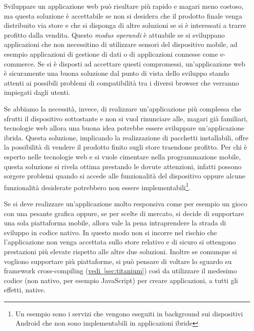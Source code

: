 		Sviluppare un applicazione web può risultare più rapido e magari meno 
		costoso, ma questa soluzione è accettabile se non si desidera che il 
		prodotto finale venga distribuito via store e che si disponga di 
		altre soluzioni se si è interessati a trarre profitto dalla vendita.
		Questo \textit{modus operandi} è attuabile se si sviluppano applicazioni
		che non necessitino di utilizzare sensori del dispositivo mobile, ad
		esempio applicazioni di gestione di dati o di applicazioni connesse 
		come e-commerce. Se si è disposti ad accettare questi compromessi,
		un'applicazione web è sicuramente una buona soluzione dal punto di vista 
		dello sviluppo \crossplat stando attenti ai possibili problemi di 
		compatibilità tra i diversi browser che verranno impiegati dagli utenti.
		
		Se abbiamo la necessità, invece, di realizzare un'applicazione più
		complessa che sfrutti il dispositivo sottostante e non si vuol
		rinunciare alle, magari già familiari, tecnologie web allora una buona
		idea potrebbe essere sviluppare	un'applicazione ibrida. Questa
		soluzione, implicando la realizzazione di pacchetti installabili, offre
		la possibilità di vendere il prodotto finito sugli store traendone
		profitto. Per chi è esperto nelle tecnologie web e si vuole cimentare
		nella programmazione mobile, questa soluzione si rivela ottima prestando
		le dovute attenzioni, infatti possono sorgere problemi quando si accede
		alle funzionalità del dispositivo oppure alcune funzionalità desiderate
		potrebbero non essere implementabili\footnote{Un esempio sono i servizi
		che vengono eseguiti in background sui dispositivi Android che non sono
		implementabili in applicazioni ibride}.
		
		Se si deve realizzare un'applicazione molto responsiva come per esempio 
		un gioco con una pesante grafica oppure, se per scelte di mercato, si
		decide di supportare una sola piattaforma mobile, allora vale la pena
		intraprendere la strada di sviluppo in codice nativo. In questo modo non
		si incorre nel rischio che l'applicazione non venga accettata sullo
		store relativo e di sicuro si ottengono prestazioni più elevate rispetto
		alle altre due soluzioni. Inoltre se comunque si vogliono supportare più
		piattaforme, si può pensare di voltare lo sguardo su framework
		cross-compiling (\hyperref[sec:titanium]{vedi~\ref{sec:titanium}}) così
		da utilizzare il medesimo codice (non nativo, per esempio JavaScript)
		per creare applicazioni, a tutti gli effetti, native.

